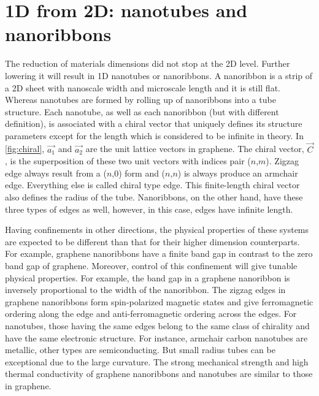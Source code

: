 \section{1D from 2D: nanotubes and nanoribbons}

The reduction of materials dimensions did not stop at the 2D level. Further lowering it will result in 1D nanotubes or nanoribbons. A nanoribbon is a strip of a 2D sheet with nanoscale width and microscale length and it is still flat. Whereas nanotubes are formed by rolling up of nanoribbons into a tube structure. Each nanotube, as well as each nanoribbon (but with different definition), is associated with a chiral vector that uniquely defines its structure parameters except for the length which is considered to be infinite in theory. In \autoref{fig:chiral}, $\vec{a_1} $ and $\vec{a_2}$ are the unit lattice vectors in graphene. The chiral vector, $\vec{C}$, is the superposition of these two unit vectors with indices pair ($n$,$m$). Zigzag edge always result from a ($n$,0) form and ($n$,$n$) is always produce an armchair edge. Everything else is called chiral type edge.  This finite-length chiral vector also defines the radius of the tube. Nanoribbons, on the other hand, have these three types of edges as well, however, in this case, edges have infinite length.

Having confinements in other directions, the physical properties of these systems are expected to be different than that for their higher dimension counterparts. For example, graphene nanoribbons have a finite band gap in contrast to the zero band gap of graphene\cite{Wang2008}. Moreover, control of this confinement will give tunable physical properties. For example, the band gap in a graphene nanoribbon is inversely proportional to the width of the nanoribbon\cite{Han2007}. The zigzag edges in graphene nanoribbons form spin-polarized magnetic states and give ferromagnetic ordering along the edge and anti-ferromagnetic ordering across the edges\cite{Son2006}. For nanotubes, those having the same edges belong to the same class of chirality and have the same electronic structure. For instance, armchair carbon nanotubes are metallic, other types are semiconducting. But small radius tubes can be exceptional due to the large curvature\cite{Bandaru2007}.  The strong mechanical strength and high thermal conductivity of graphene nanoribbons and nanotubes are similar to those in graphene.

